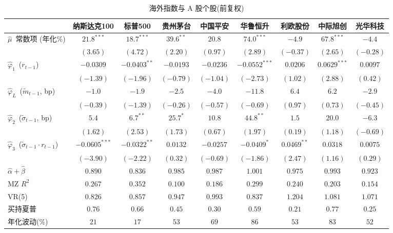 \begin{table}[htbp]\centering
\caption{海外指数与 A 股个股(前复权)}\label{tab:stk}
\footnotesize\setlength{\tabcolsep}{4pt}
\begin{threeparttable}
\begin{tabular}{lcccccccc}
\toprule
 & 纳斯达克100 & 标普500 & 贵州茅台 & 中国平安 & 华鲁恒升 & 利欧股份 & 中际旭创 & 光华科技 \\
\midrule
$\hat\mu$~常数项 (年化\%) & $21.8^{***}$ & $18.7^{***}$ & $39.6^{**}$ & $20.8$ & $74.0^{***}$ & $-4.9$ & $67.8^{***}$ & $-4.4$ \\
 & $(3.65)$ & $(4.72)$ & $(2.20)$ & $(0.97)$ & $(2.89)$ & $(-0.37)$ & $(2.65)$ & $(-0.28)$ \\[2pt]
$\hat\varphi_1$~($r_{t-1}$) & $-0.0309$ & $-0.0403^{**}$ & $-0.0193$ & $-0.0236$ & $-0.0552^{***}$ & $0.0206$ & $0.0629^{***}$ & $0.0097$ \\
 & $(-1.39)$ & $(-1.96)$ & $(-0.79)$ & $(-1.04)$ & $(-2.73)$ & $(1.02)$ & $(2.88)$ & $(0.42)$ \\[2pt]
$\hat\varphi_L$~($\tilde m_{t-1}$, bp) & $-1.0$ & $-1.9$ & $-2.5$ & $-4.0$ & $-11.8$ & $6.4$ & $6.2$ & $-2.9$ \\
 & $(-0.39)$ & $(-1.39)$ & $(-0.26)$ & $(-0.57)$ & $(-0.69)$ & $(0.97)$ & $(0.73)$ & $(-0.45)$ \\[2pt]
$\hat\varphi_2$~($\tilde\sigma_{t-1}$, bp) & $5.4$ & $6.7^{**}$ & $25.7^{*}$ & $10.8$ & $44.8^{**}$ & $1.5$ & $20.0$ & $-6.3$ \\
 & $(1.62)$ & $(2.53)$ & $(1.73)$ & $(0.67)$ & $(1.97)$ & $(0.19)$ & $(1.18)$ & $(-0.69)$ \\[2pt]
$\hat\varphi_3$~($\tilde\sigma_{t-1}\!\cdot\! r_{t-1}$) & $-0.0605^{***}$ & $-0.0322^{**}$ & $0.0132$ & $-0.0257$ & $-0.0409^{*}$ & $0.0469^{**}$ & $0.0318$ & $0.0075$ \\
 & $(-3.90)$ & $(-2.22)$ & $(0.32)$ & $(-0.69)$ & $(-1.86)$ & $(2.47)$ & $(1.16)$ & $(0.29)$ \\[2pt]
\midrule
$\hat\alpha+\hat\beta$ & $0.890$ & $0.836$ & $0.985$ & $0.987$ & $1.001$ & $0.975$ & $0.993$ & $0.923$ \\
MZ $R^2$ & $0.267$ & $0.352$ & $0.100$ & $0.186$ & $0.299$ & $0.240$ & $0.203$ & $0.154$ \\
VR(5) & $0.826$ & $0.857$ & $0.947$ & $0.993$ & $0.837$ & $1.204$ & $1.081$ & $1.071$ \\
买持夏普 & $0.76$ & $0.66$ & $0.45$ & $0.30$ & $0.59$ & $0.21$ & $0.77$ & $0.25$ \\
年化波动(\%) & $21$ & $17$ & $53$ & $69$ & $86$ & $53$ & $83$ & $52$ \\

\end{tabular}
\end{threeparttable}
\end{table}
